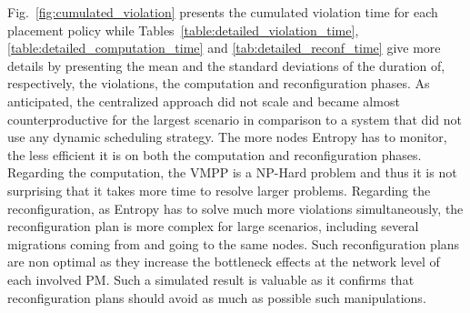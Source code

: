 
Fig.~\ref{fig:cumulated_violation} presents the cumulated violation
time for each placement policy while
Tables~\ref{table:detailed_violation_time},
\ref{table:detailed_computation_time} and
\ref{tab:detailed_reconf_time} give more details by presenting the
mean and the standard deviations of the duration of, respectively, the
violations, the computation and reconfiguration phases. As
anticipated, the centralized approach did not scale and became almost
counterproductive for the largest scenario in comparison to a system
that did not use any dynamic scheduling strategy. The more nodes Entropy has to
monitor, the less efficient it is on both the computation and
reconfiguration phases. Regarding the computation, the VMPP is a
NP-Hard problem and thus it is not surprising that it takes more time
to resolve larger problems. Regarding the reconfiguration, as Entropy
has to solve much more violations simultaneously, the reconfiguration plan
is more complex for large scenarios, including several migrations
coming from and going to the same nodes. Such reconfiguration plans
are non optimal as they increase the bottleneck effects at the network
level of each involved PM. Such a simulated result is valuable as it confirms
that reconfiguration plans should avoid as much as possible such
manipulations.


